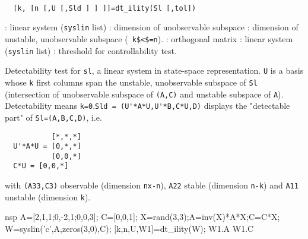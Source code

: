 \begin{mandesc}
   \\ %
\end{mandesc}
\begin{calling_sequence}
\begin{verbatim}
  [k, [n [,U [,Sld ] ] ]]=dt_ility(Sl [,tol])  
\end{verbatim}
\end{calling_sequence}
\begin{parameters}
  \begin{varlist}
    : linear system (\verb!syslin! list)
    : dimension of unobservable subspace
    : dimension of unstable, unobservable subspace (\verb! k$<$=n!).
    : orthogonal matrix
    : linear system (\verb!syslin! list)
    : threshold for controllability test.
  \end{varlist}
\end{parameters}
\begin{mandescription}
  Detectability test for \verb!sl!, a linear system in state-space
  representation.  \verb!U! is a basis whose \verb!k! first columns span the
  unstable, unobservable subspace of \verb!Sl! (intersection of unobservable
  subspace of \verb!(A,C)! and unstable subspace of \verb!A!). Detectability
  means \verb!k=0!.\verb!Sld = (U'*A*U,U'*B,C*U,D)! displays the "detectable
  part" of \verb!Sl=(A,B,C,D)!, i.e.
\begin{verbatim}
           [*,*,*]
  U'*A*U = [0,*,*]
           [0,0,*]
  C*U = [0,0,*]
\end{verbatim}
with \verb!(A33,C3)! observable (dimension \verb!nx-n!), \verb!A22! stable 
(dimension \verb!n-k!) and \verb!A11! unstable (dimension \verb!k!).
\end{mandescription}
\begin{examples}
  \begin{mintednsp}{nsp}
    A=[2,1,1;0,-2,1;0,0,3];
    C=[0,0,1];
    X=rand(3,3);A=inv(X)*A*X;C=C*X;
    W=syslin('c',A,zeros(3,0),C);
    [k,n,U,W1]=dt_ility(W);
    W1.A
    W1.C
  \end{mintednsp}
\end{examples}
\begin{manseealso}
       
\end{manseealso}
